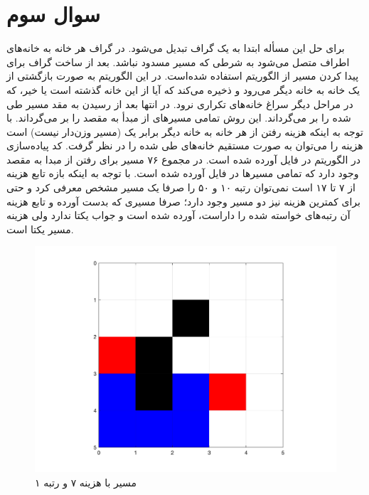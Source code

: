 \section{سوال سوم}
برای حل این مسأله ابتدا  به یک گراف تبدیل می‌شود. در گراف هر خانه به خانه‌های اطراف متصل می‌شود به شرطی که مسیر مسدود نباشد. بعد از ساخت گراف برای پیدا کردن مسیر از الگوریتم 
استفاده شده‌است. در این الگوریتم به صورت بازگشتی از یک خانه به خانه دیگر می‌رود و ذخیره می‌کند که آیا از این خانه گذشته است یا خیر، که در مراحل دیگر سراغ خانه‌های تکراری نرود. در انتها بعد از رسیدن به مقد مسیر طی شده را بر می‌گرداند. این روش تمامی مسیرهای از مبدأ به مقصد را بر می‌گرداند. با توجه به اینکه هزینه رفتن از هر خانه به خانه دیگر برابر یک (مسیر وزن‌دار نیست) است هزینه را می‌توان به صورت مستقیم خانه‌های طی شده را در نظر گرفت.
کد پیاده‌سازی در الگوریتم  در فایل  آورده شده است.
 در مجموع ۷۶ مسیر برای رفتن از مبدا به مقصد وجود دارد که تمامی مسیرها در فایل
 آورده شده است. با توجه به اینکه بازه تابع هزینه از ۷ تا ۱۷ است نمی‌توان رتبه ۱۰ و ۵۰ را صرفا یک مسیر مشخص معرفی کرد و حتی برای کمترین هزینه نیز دو مسیر وجود دارد؛ صرفا مسیری که  بدست آورده و تابع هزینه آن رتبه‌های خواسته شده را داراست، آورده شده است و جواب یکتا ندارد ولی هزینه مسیر یکتا است.
 \begin{figure}[!h]
 	\includegraphics[width=12cm]{../Figure/Q3/1th_path.png}
 	\centering
 	\caption{مسیر با هزینه ۷ و رتبه ۱}
 \end{figure}

